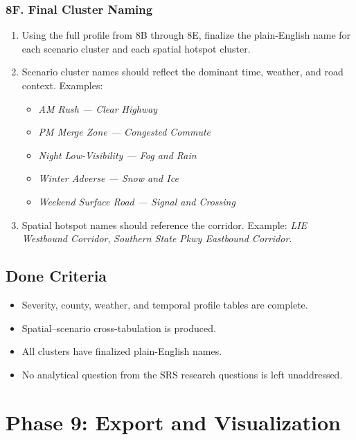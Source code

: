 \documentclass[11pt]{article}
\begin{document}
\subsubsection*{8F. Final Cluster Naming}

\begin{enumerate}
  \item Using the full profile from 8B through 8E, finalize the plain-English name for each scenario cluster and each spatial hotspot cluster.
  \item Scenario cluster names should reflect the dominant time, weather, and road context. Examples:
  \begin{itemize}
    \item \textit{AM Rush --- Clear Highway}
    \item \textit{PM Merge Zone --- Congested Commute}
    \item \textit{Night Low-Visibility --- Fog and Rain}
    \item \textit{Winter Adverse --- Snow and Ice}
    \item \textit{Weekend Surface Road --- Signal and Crossing}
  \end{itemize}
  \item Spatial hotspot names should reference the corridor. Example: \textit{LIE Westbound Corridor}, \textit{Southern State Pkwy Eastbound Corridor}.
\end{enumerate}

\subsection{Done Criteria}

\begin{itemize}
  \item Severity, county, weather, and temporal profile tables are complete.
  \item Spatial--scenario cross-tabulation is produced.
  \item All clusters have finalized plain-English names.
  \item No analytical question from the SRS research questions is left unaddressed.
\end{itemize}

\newpage
\section{Phase 9: Export and Visualization}
\end{document}
